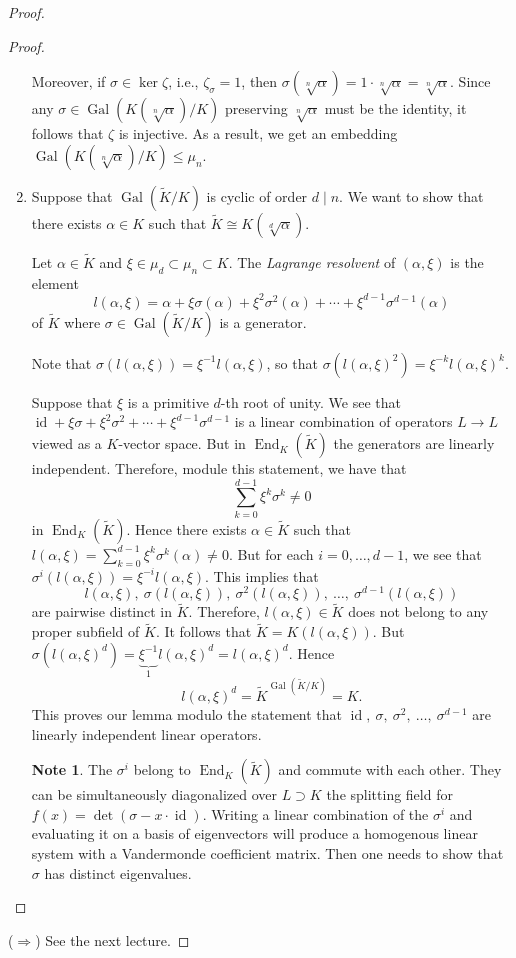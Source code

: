 \documentclass[10pt,letterpaper,cm]{nupset}
\theoremstyle{definition}
\newtheorem{note}{Note}
\newcommand{\1}{\mathbf{1}}
\newcommand{\0}{\vec 0}
\DeclareMathOperator{\id}{id}
\DeclareMathOperator{\gal}{Gal}
\DeclareMathOperator{\ed}{End}
\begin{document}
\begin{proof}
\begin{proof}
\begin{enumerate}[label=(\alph*)]
 Moreover, if $\sigma \in \ker{\zeta}$, i.e., $\zeta_{\sigma} = 1$, then $\sigma(\sqrt[n]{\alpha}) = 1 \cdot \sqrt[n]{\alpha} = \sqrt[n]{\alpha}$. Since any $\sigma \in \gal(K(\sqrt[n]{\alpha})/K)$ preserving $\sqrt[n]{\alpha}$ must be the identity, it follows that $\zeta$ is injective. As a result, we get an embedding $\gal(K(\sqrt[n]{\alpha})/K) \leq \mu_n$.
 
\item Suppose that $\gal(\widetilde{K}/K)$ is cyclic of order $d \mid n$. We want to show that there exists $\alpha \in K$ such that $\widetilde{K} \cong K(\sqrt[d]{\alpha})$. 

Let $ \alpha \in \widetilde{K}$ and $\xi \in \mu_d \subset \mu_n \subset K$. The \textit{Lagrange resolvent} of $(\alpha, \xi)$ is the element $$ l(\alpha, \xi) =    \alpha + \xi \sigma(\alpha) + \xi^2 \sigma^2(\alpha) + \cdots + \xi^{d-1} \sigma^{d-1}(\alpha)$$ of $\widetilde{K}$ where $\sigma \in \gal(\widetilde{K}/K)$ is a generator. 

Note that $\sigma(l(\alpha, \xi)) = \xi^{-1}l(\alpha, \xi)$, so that $\sigma(l(\alpha, \xi)^2) = \xi^{-k}l(\alpha, \xi)^k$.

Suppose that $\xi$ is a primitive $d$-th root of unity.  We see that $\id + \xi \sigma + \xi^2 \sigma^2 + \cdots + \xi^{d-1} \sigma^{d-1}$ is a linear combination of operators $L \to L$ viewed as a $K$-vector space. But in $\ed_K(\widetilde{K})$ the generators are linearly independent. Therefore, module this statement, we have that $$ \sum_{k=0}^{d-1} \xi^k \sigma^k  \ne 0 $$ in $\ed_K(\widetilde{K})$. Hence there exists $\alpha \in \widetilde{K}$ such that $l(\alpha, \xi) = \sum_{k=0}^{d-1} \xi^k \sigma^k(\alpha) \ne 0$. But for each $i=0, \ldots, d-1$, we see that $\sigma^i(l(\alpha, \xi)) = \xi^{-i}l(\alpha, \xi)$. This implies that $$l(\alpha, \xi), \ \sigma(l(\alpha, \xi)), \ \sigma^2(l(\alpha, \xi)), \ \ldots, \ \sigma^{d-1}(l(\alpha, \xi))$$ are pairwise distinct in $\widetilde{K}$. Therefore, $l(\alpha, \xi) \in \widetilde{K}$ does not belong to any proper subfield of $\widetilde{K}$. It follows that $\widetilde{K} = K(l(\alpha, \xi))$. But $\sigma(l(\alpha, \xi)^d) = \underbrace{\xi^{-1}}_{1}l(\alpha, \xi)^d = l(\alpha, \xi)^d.$ Hence $$l(\alpha, \xi)^d = \widetilde{K}^{\gal(\widetilde{K}/K)} = K.$$This proves our lemma modulo the statement that $\id, \ \sigma, \  \sigma^2, \ \ldots , \ \sigma^{d-1}$ are linearly independent linear operators.
\begin{note}
The $\sigma^i$ belong to $\ed_K(\widetilde{K})$ and commute with each other. They can be simultaneously diagonalized over $L \supset K$ the splitting field for $f(x) = \det(\sigma - x \cdot \id)$. Writing a linear combination of the $\sigma^i$ and evaluating it on a basis of eigenvectors will produce a homogenous linear system with a Vandermonde coefficient matrix. Then one needs to show that $\sigma$ has distinct eigenvalues. 
\end{note}
\end{enumerate}
\end{proof}
($\Longrightarrow$) See the next lecture.
\end{proof}
\end{document}
